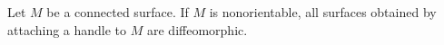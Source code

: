 Let $M$ be a connected surface. If $M$ is nonorientable, all surfaces obtained by attaching a handle to $M$ are diffeomorphic.
